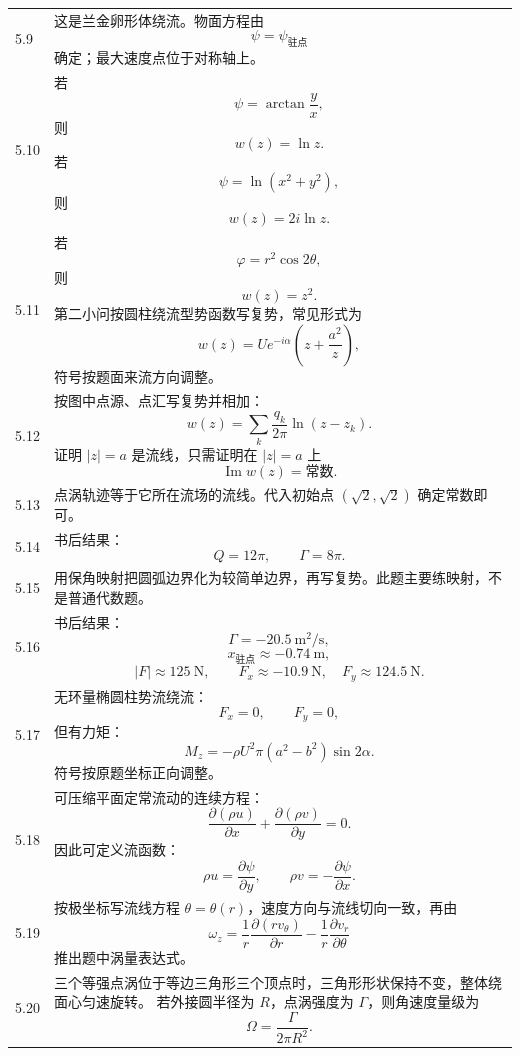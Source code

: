 ﻿\documentclass[UTF8,zihao=-4]{ctexart}
\begin{document}
\begin{longtable}{p{1.3cm}p{12.6cm}}
5.9 &
这是兰金卵形体绕流。物面方程由
\[
\psi=\psi_{\text{驻点}}
\]
确定；最大速度点位于对称轴上。\\

5.10 &
若
\[
\psi=\arctan\frac{y}{x},
\]
则
\[
w(z)=\ln z.
\]
若
\[
\psi=\ln(x^2+y^2),
\]
则
\[
w(z)=2i\ln z.
\]\\

5.11 &
若
\[
\varphi=r^2\cos2\theta,
\]
则
\[
w(z)=z^2.
\]
第二小问按圆柱绕流型势函数写复势，常见形式为
\[
w(z)=Ue^{-i\alpha}\left(z+\frac{a^2}{z}\right),
\]
符号按题面来流方向调整。\\

5.12 &
按图中点源、点汇写复势并相加：
\[
w(z)=\sum_k \frac{q_k}{2\pi}\ln(z-z_k).
\]
证明 $|z|=a$ 是流线，只需证明在 $|z|=a$ 上
\[
\operatorname{Im}w(z)=\text{常数}.
\]\\

5.13 &
点涡轨迹等于它所在流场的流线。代入初始点 $(\sqrt2,\sqrt2)$ 确定常数即可。\\

5.14 &
书后结果：
\[
Q=12\pi,\qquad \Gamma=8\pi.
\]\\

5.15 &
用保角映射把圆弧边界化为较简单边界，再写复势。此题主要练映射，不是普通代数题。\\

5.16 &
书后结果：
\[
\Gamma=-20.5\ \mathrm{m^2/s},
\]
\[
x_{\text{驻点}}\approx -0.74\ \mathrm{m},
\]
\[
|F|\approx125\ \mathrm{N},
\qquad F_x\approx -10.9\ \mathrm{N},\quad F_y\approx124.5\ \mathrm{N}.
\]\\

5.17 &
无环量椭圆柱势流绕流：
\[
F_x=0,\qquad F_y=0,
\]
但有力矩：
\[
M_z=-\rho U^2\pi(a^2-b^2)\sin2\alpha.
\]
符号按原题坐标正向调整。\\

5.18 &
可压缩平面定常流动的连续方程：
\[
\frac{\partial(\rho u)}{\partial x}
+\frac{\partial(\rho v)}{\partial y}=0.
\]
因此可定义流函数：
\[
\rho u=\frac{\partial\psi}{\partial y},\qquad
\rho v=-\frac{\partial\psi}{\partial x}.
\]\\

5.19 &
按极坐标写流线方程 $\theta=\theta(r)$，速度方向与流线切向一致，再由
\[
\omega_z=\frac1r\frac{\partial(rv_\theta)}{\partial r}
-\frac1r\frac{\partial v_r}{\partial\theta}
\]
推出题中涡量表达式。\\

5.20 &
三个等强点涡位于等边三角形三个顶点时，三角形形状保持不变，整体绕面心匀速旋转。
若外接圆半径为 $R$，点涡强度为 $\Gamma$，则角速度量级为
\[
\Omega=\frac{\Gamma}{2\pi R^2}.
\]\\


\end{longtable}
\end{document}
